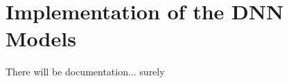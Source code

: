 \chapter{Implementation of the DNN Models} \label{chapter:appendix_a}

There will be documentation... surely